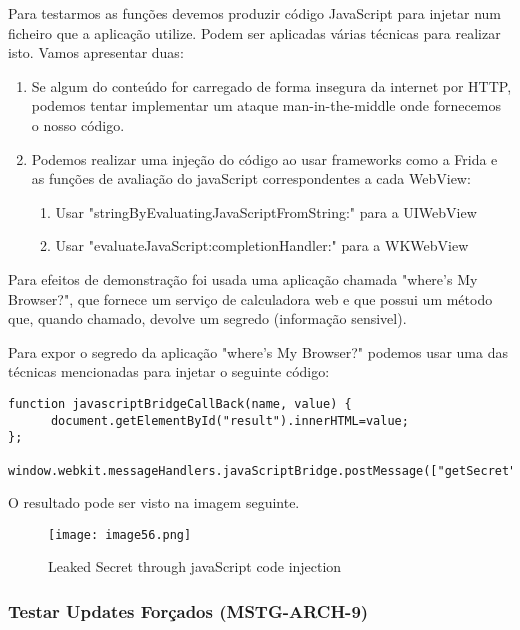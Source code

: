 Para testarmos as funções devemos produzir código JavaScript para injetar num ficheiro que a aplicação utilize. Podem ser aplicadas várias técnicas para realizar isto. Vamos apresentar duas:
\begin{enumerate}

\item Se algum do conteúdo for carregado de forma insegura da internet por HTTP, podemos tentar implementar um ataque man-in-the-middle onde fornecemos o nosso código. \par
\hfill\par

\item Podemos realizar uma injeção do código ao usar frameworks como a Frida e as funções de avaliação do javaScript correspondentes a cada WebView:
	\begin{enumerate}
		\item Usar "stringByEvaluatingJavaScriptFromString:" para a UIWebView \par
\hfill\par
		\item Usar "evaluateJavaScript:completionHandler:" para a WKWebView
	\end{enumerate}
\end{enumerate}
Para efeitos de demonstração foi usada uma aplicação chamada "where's My Browser?", que fornece um serviço de calculadora web e que possui um método que, quando chamado, devolve um segredo (informação sensivel).\par
\hfill\par
Para expor o segredo da aplicação "where's My Browser?" podemos usar uma das técnicas mencionadas para injetar o seguinte código:

\begin{lstlisting}[basicstyle=\small,]
function javascriptBridgeCallBack(name, value) {
	  document.getElementById("result").innerHTML=value;
};

window.webkit.messageHandlers.javaScriptBridge.postMessage(["getSecret"]);
\end{lstlisting}
O resultado pode ser visto na imagem seguinte.

\begin{figure}[H]
\centering
\texttt{[image: image56.png]}
\caption {Leaked Secret through javaScript code injection}
\label {fig02}
\end{figure}


\subsubsection{Testar Updates Forçados (MSTG-ARCH-9)}
\hfill\par
\hfill\par

